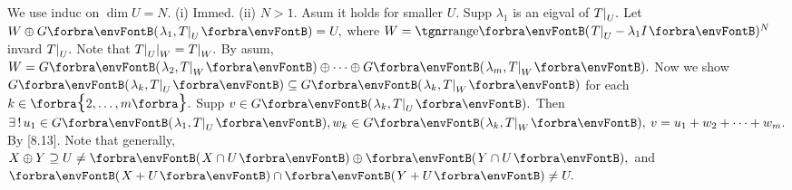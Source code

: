 We use induc on $\dim U=N.$ (i) Immed. (ii) $N>1.$ Asum it holds for smaller $U.$\parSol{}
Supp $\lambda_1$ is an eigval of $T\text{\normalsize|}_U.$ Let $W\oplus G\Par{\lambda_1,T\mmid_U}=U,$ where $W=\Range\Par{T\mmid_U-\lambda_1I}{^N}$ invard $T\text{\normalsize|}_U.$\parSol{}
Note that $T\text{\normalsize|}_U\text{\normalsize|}_W=T\text{\normalsize|}_W.$ By asum, $W=G\Par{\lambda_2,T\mmid_W}\oplus\cdots\oplus G\Par{\lambda_m,T\mmid_W}.$\parSol{}
Now we show $G\Par{\lambda_k,T\mmid_U}\subseteq G\Par{\lambda_k,T\mmid_W}$ for each $k\in\Bra{2,\dots,m}.$ Supp $v\in G\Par{\lambda_k,T\mmid_U}.$\parSol{}
Then $\exists\,!\,u_1\in G\Par{\lambda_1,T\mmid_U},w_k\in G\Par{\lambda_k,T\mmid_W},\:v=u_1+w_2+\dots+w_m.$ By [8.13].\PfEnd\vspace{2pt}
\AComm Note that generally, $X\oplus Y\supseteq U\neq\Par{X\cap U}\oplus\Par{Y\cap U},$ and $\Par{X+U}\cap\Par{Y+U}\neq U.$
\SepLine

\SepLine\pagebreak

